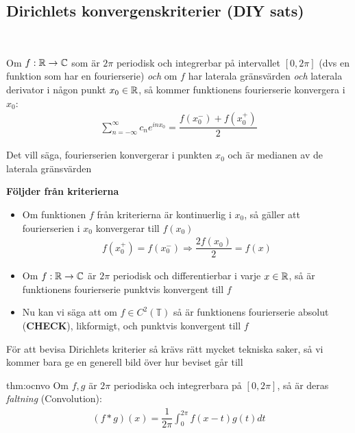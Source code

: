 \subsection{Dirichlets konvergenskriterier (DIY sats)}\hfill\\\par
\noindent Om $f:\mathbb{R}\to\mathbb{C}$ som är $2\pi$ periodisk och integrerbar på intervallet $[0,2\pi]$ (dvs en funktion som har en fourierserie) \textit{och} om $f$ har laterala gränsvärden \textit{och} laterala derivator i någon punkt $x_0\in\mathbb{R}$, så kommer funktionens fourierserie konvergera i $x_0$:
\begin{equation*}
  \begin{gathered}
    \sum_{n=-\infty}^{\infty}c_ne^{inx_0} = \dfrac{f(x_0^-)+f(x_0^+)}{2}
  \end{gathered}
\end{equation*}
\par\bigskip
\noindent Det vill säga, fourierserien konvergerar i punkten $x_0$ och är medianen av de laterala gränsvärden
\par\bigskip
\noindent\textbf{Följder från kriterierna}\par
\begin{itemize}
  \item Om funktionen $f$ från kriterierna är kontinuerlig i $x_0$, så gäller att fourierserien i $x_0$ konvergerar till $f(x_0)$ 
    \begin{equation*}
      \begin{gathered}
        f(x_0^+) = f(x_0^-)\Rightarrow \dfrac{2f(x_0)}{2} = f(x)
      \end{gathered}
    \end{equation*}
    \par\bigskip
  \item Om $f:\mathbb{R}\to\mathbb{C}$ är $2\pi$ periodisk och differentierbar i varje $x\in\mathbb{R}$, så är funktionens fourierserie punktvis konvergent till $f$
    \par\bigskip
  \item Nu kan vi säga att om $f\in C^2(\mathbb{T})$ så är funktionens fourierserie absolut (\textbf{CHECK}), likformigt, och punktvis konvergent till $f$
    \par\bigskip
\end{itemize}
\par\bigskip
\noindent För att bevisa Dirichlets kriterier så krävs rätt mycket tekniska saker, så vi kommer bara ge en generell bild över hur beviset går till
\par\bigskip
\begin{theo}{thm:ocnvo}
  Om $f,g$ är $2\pi$ periodiska och integrerbara på $[0,2\pi]$, så är deras \textit{faltning} (Convolution):
  \begin{equation*}
    \begin{gathered}
      (f*g)(x) = \dfrac{1}{2\pi}\int_{0}^{2\pi}f(x-t)g(t)dt
    \end{gathered}
  \end{equation*}
\end{theo}
